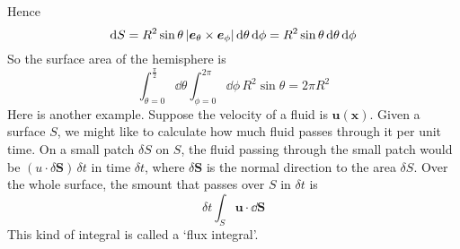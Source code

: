 \documentclass{article}
\begin{document}
Hence
\[ \dd S = R^2 \sin\theta\, \abs{\bm e_\theta \times \bm e_\phi} \,\dd \theta\,\dd \phi = R^2 \sin \theta \,\dd \theta \,\dd \phi \]
So the surface area of the hemisphere is
\[ \int_{\theta = 0}^{\frac{\pi}{2}} \dd \theta \int_{\phi = 0}^{2 \pi} \dd \phi \, R^2 \sin \theta = 2 \pi R^2 \]
Here is another example. Suppose the velocity of a fluid is $\bm u(\bm x)$. Given a surface $S$, we might like to calculate how much fluid passes through it per unit time. On a small patch $\delta S$ on $S$, the fluid passing through the small patch would be $(u \cdot \delta \bm S)\,\delta t$ in time $\delta t$, where $\delta \bm S$ is the normal direction to the area $\delta S$. Over the whole surface, the smount that passes over $S$ in $\delta t$ is
\[ \delta t \int_S \bm u \cdot \dd \bm S \]
This kind of integral is called a `flux integral'.
\end{document}
